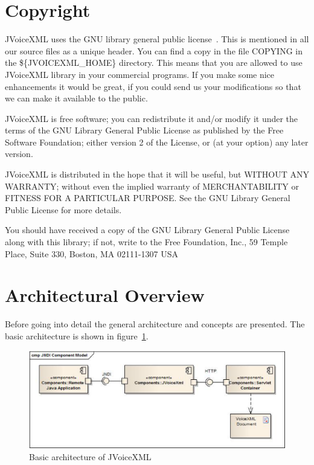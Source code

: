 \documentclass[11pt,a4paper]{article}
\begin{document}
\section{Copyright}
\label{sec:copyright}

JVoiceXML uses the GNU library general public license~\cite{gnu:lgpg}. 
This is mentioned in all our source files as a unique header.
You can find a copy in the file COPYING in the \$\{JVOICEXML\_HOME\}
directory. This means that you are allowed to use JVoiceXML
library in your commercial programs. If you make some nice
enhancements it would be great, if you could send us your
modifications so that we can make it available to the public.

\medskip 

JVoiceXML is free software; you can redistribute it and/or
modify it under the terms of the GNU Library General Public
License as published by the Free Software Foundation; either
version 2 of the License, or (at your option) any later version.

JVoiceXML is distributed in the hope that it will be useful,
but WITHOUT ANY WARRANTY; without even the implied warranty of
MERCHANTABILITY or FITNESS FOR A PARTICULAR PURPOSE. See the GNU
Library General Public License for more details.

You should have received a copy of the GNU Library General Public
License along with this library; if not, write to the Free
Foundation, Inc., 59 Temple Place, Suite 330, Boston, MA  02111-1307  USA

\section{Architectural Overview}
\label{sec:arch-overv}

Before going into detail the general architecture and concepts are presented.
The basic architecture is shown in figure~\ref{fig:architecture}.
\begin{figure}
\includegraphics[width=\linewidth]{client-architecture.eps}
\caption{Basic architecture of JVoiceXML}
\label{fig:architecture}
\end{figure}
\end{document}

